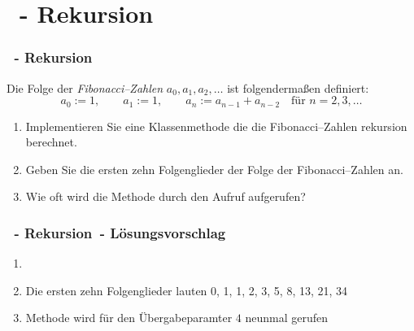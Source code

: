 \def\stitle{\theexercise\ - Rekursion}
\section{\stitle}
\begin{frame}%
  \frametitle{\stitle}%


Die Folge der \emph{Fibonacci--Zahlen} $a_0, a_1, a_2, \dotsc$ ist folgenderma\ss en definiert:
\begin{equation*}
a_0 := 1,\qquad
a_1 := 1,\qquad
a_n := a_{n-1} + a_{n-2}\quad\text{f\"ur } n = 2,3,\dotsc
\end{equation*}
\medskip

\begin{enumerate}
\item Implementieren Sie eine Klassenmethode die die Fibonacci--Zahlen rekursion berechnet.
\item Geben Sie die ersten zehn Folgenglieder der Folge der Fibonacci--Zahlen an.
\item Wie oft wird die Methode durch den Aufruf  aufgerufen?
\end{enumerate}
\end{frame}


\begin{frame}%
  \frametitle{\stitle\ - L\"osungsvorschlag}%
\begin{enumerate}
\item 
\item Die ersten zehn Folgenglieder lauten 0, 1, 1, 2, 3, 5, 8, 13, 21, 34
\item Methode  wird f\"ur den \"Ubergabeparamter $4$ neunmal gerufen
\end{enumerate}
\end{frame}
